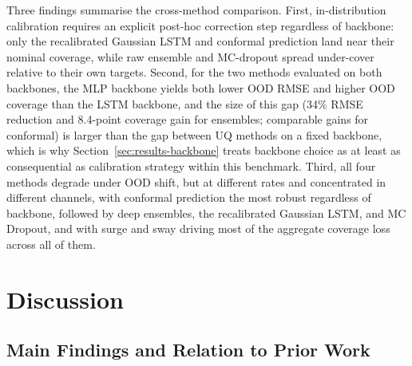 \documentclass[a4paper,fleqn]{cas-sc}
\begin{document}
Three findings summarise the cross-method comparison. First, in-distribution calibration requires an explicit post-hoc correction step regardless of backbone: only the recalibrated Gaussian LSTM and conformal prediction land near their nominal coverage, while raw ensemble and MC-dropout spread under-cover relative to their own targets. Second, for the two methods evaluated on both backbones, the MLP backbone yields both lower OOD RMSE and higher OOD coverage than the LSTM backbone, and the size of this gap (34\% RMSE reduction and 8.4-point coverage gain for ensembles; comparable gains for conformal) is larger than the gap between UQ methods on a fixed backbone, which is why Section~\ref{sec:results-backbone} treats backbone choice as at least as consequential as calibration strategy within this benchmark. Third, all four methods degrade under OOD shift, but at different rates and concentrated in different channels, with conformal prediction the most robust regardless of backbone, followed by deep ensembles, the recalibrated Gaussian LSTM, and MC Dropout, and with surge and sway driving most of the aggregate coverage loss across all of them.

\section{Discussion}
\label{sec:discussion}

\subsection{Main Findings and Relation to Prior Work}
\end{document}
